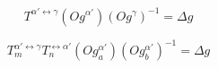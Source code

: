 $$T^{\alpha'\leftrightarrow\gamma}\left(Og^{\alpha'}\right)\left(Og^{\gamma}\right)^{-1} = \Delta g \label{eq:1}$$

$$T_{m}^{\alpha'\leftrightarrow\gamma}T_{n}^{\leftrightarrow\alpha'}\left(Og_{a}^{\alpha'}\right)\left(Og_{b}^{\alpha'}\right)^{-1} = \Delta g \label{eq:2}$$
